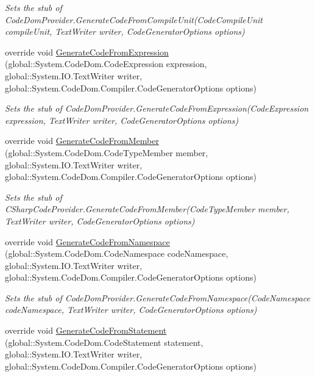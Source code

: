 \begin{DoxyCompactItemize}
\begin{DoxyCompactList}\small\item\em Sets the stub of Code\-Dom\-Provider.\-Generate\-Code\-From\-Compile\-Unit(\-Code\-Compile\-Unit compile\-Unit, Text\-Writer writer, Code\-Generator\-Options options)\end{DoxyCompactList}\item 
override void \hyperlink{class_microsoft_1_1_c_sharp_1_1_fakes_1_1_stub_c_sharp_code_provider_a17f8f8623466e01df3fd1488864209ce}{Generate\-Code\-From\-Expression} (global\-::\-System.\-Code\-Dom.\-Code\-Expression expression, global\-::\-System.\-I\-O.\-Text\-Writer writer, global\-::\-System.\-Code\-Dom.\-Compiler.\-Code\-Generator\-Options options)
\begin{DoxyCompactList}\small\item\em Sets the stub of Code\-Dom\-Provider.\-Generate\-Code\-From\-Expression(\-Code\-Expression expression, Text\-Writer writer, Code\-Generator\-Options options)\end{DoxyCompactList}\item 
override void \hyperlink{class_microsoft_1_1_c_sharp_1_1_fakes_1_1_stub_c_sharp_code_provider_a3577e0c3399818d4b22a0940912064bc}{Generate\-Code\-From\-Member} (global\-::\-System.\-Code\-Dom.\-Code\-Type\-Member member, global\-::\-System.\-I\-O.\-Text\-Writer writer, global\-::\-System.\-Code\-Dom.\-Compiler.\-Code\-Generator\-Options options)
\begin{DoxyCompactList}\small\item\em Sets the stub of C\-Sharp\-Code\-Provider.\-Generate\-Code\-From\-Member(\-Code\-Type\-Member member, Text\-Writer writer, Code\-Generator\-Options options)\end{DoxyCompactList}\item 
override void \hyperlink{class_microsoft_1_1_c_sharp_1_1_fakes_1_1_stub_c_sharp_code_provider_a6760b828b2463be771c5045650d574df}{Generate\-Code\-From\-Namespace} (global\-::\-System.\-Code\-Dom.\-Code\-Namespace code\-Namespace, global\-::\-System.\-I\-O.\-Text\-Writer writer, global\-::\-System.\-Code\-Dom.\-Compiler.\-Code\-Generator\-Options options)
\begin{DoxyCompactList}\small\item\em Sets the stub of Code\-Dom\-Provider.\-Generate\-Code\-From\-Namespace(\-Code\-Namespace code\-Namespace, Text\-Writer writer, Code\-Generator\-Options options)\end{DoxyCompactList}\item 
override void \hyperlink{class_microsoft_1_1_c_sharp_1_1_fakes_1_1_stub_c_sharp_code_provider_a441bc133de2c3e1ca5da6ce0fca2e0d2}{Generate\-Code\-From\-Statement} (global\-::\-System.\-Code\-Dom.\-Code\-Statement statement, global\-::\-System.\-I\-O.\-Text\-Writer writer, global\-::\-System.\-Code\-Dom.\-Compiler.\-Code\-Generator\-Options options)

\end{DoxyCompactItemize}
